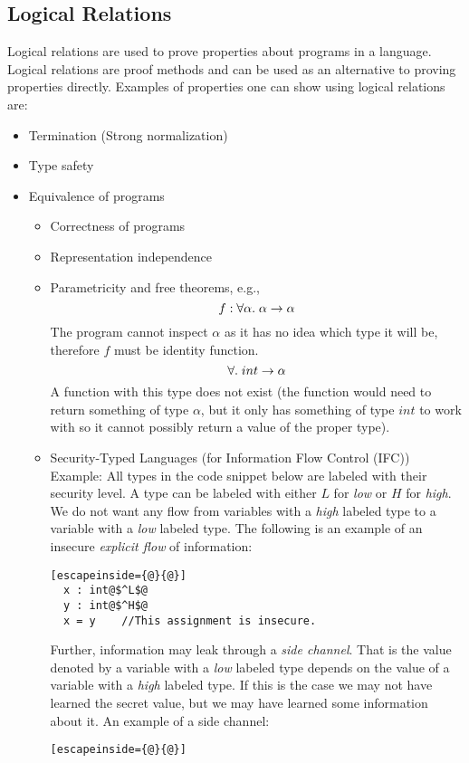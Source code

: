 \subsection*{Logical Relations}
Logical relations are used to prove properties about programs in a language. Logical relations are proof methods and can be used as an alternative to proving properties directly. Examples of properties one can show using logical relations are:
\begin{itemize}
\item Termination (Strong normalization)
\item Type safety
\item Equivalence of programs
  \begin{itemize}
  \item Correctness of programs
  \item Representation independence
  \item Parametricity and free theorems, e.g.,
    \[
    f: \forall \alpha. \;  \alpha \rightarrow \alpha
    \]
    The program cannot inspect $\alpha$ as it has no idea which type it will be, therefore $f$ must be identity function.
    \[
    \forall. \;  int \rightarrow \alpha
    \]
    A function with this type does not exist (the function would need to return something of type $\alpha$, but it only has something of type $int$ to work with so it cannot possibly return a value of the proper type).
  \item Security-Typed Languages (for Information Flow Control (IFC))\\
        Example: All types in the code snippet below are labeled with their security level. A type can be labeled with either $L$ for \emph{low} or $H$ for \emph{high}. We do not want any flow from variables with a \emph{high} labeled type to a variable with a \emph{low} labeled type. The following is an example of an insecure \emph{explicit flow} of information:
        \begin{lstlisting}[escapeinside={@}{@}]
  x : int@$^L$@
  y : int@$^H$@
  x = y    //This assignment is insecure.
        \end{lstlisting}
Further, information may leak through a \emph{side channel}. That is the value denoted by a variable with a \emph{low} labeled type depends on the value of a variable with a \emph{high} labeled type. If this is the case we may not have learned the secret value, but we may have learned some information about it. An example of a side channel:
        \begin{lstlisting}[escapeinside={@}{@}]

\end{lstlisting}
\end{itemize}
\end{itemize}
